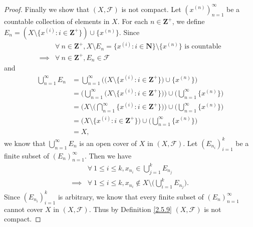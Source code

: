 \begin{proof}
    Finally we show that \((X, \mathcal{F})\) is not compact.
    Let \((x^{(n)})_{n = 1}^\infty\) be a countable collection of elements in \(X\).
    For each \(n \in \mathbf{Z}^+\), we define \(E_n = (X \setminus \{x^{(i)} : i \in \mathbf{Z}^+\}) \cup \{x^{(n)}\}\).
    Since
    \begin{align*}
                 & \forall\ n \in \mathbf{Z}^+, X \setminus E_n = \{x^{(i)} : i \in \mathbf{N}\} \setminus \{x^{(n)}\} \text{ is countable} \\
        \implies & \forall\ n \in \mathbf{Z}^+, E_n \in \mathcal{F}
    \end{align*}
    and
    \begin{align*}
        \bigcup_{n = 1}^\infty E_n & = \bigcup_{n = 1}^\infty \Big(\big(X \setminus \{x^{(i)} : i \in \mathbf{Z}^+\}\big) \cup \{x^{(n)}\}\Big)                                        \\
                                   & = \bigg(\bigcup_{n = 1}^\infty \big(X \setminus \{x^{(i)} : i \in \mathbf{Z}^+\}\big)\bigg) \cup \bigg(\bigcup_{n = 1}^\infty \{x^{(n)}\}\bigg)   \\
                                   & = \Bigg(X \setminus \bigg(\bigcap_{n = 1}^\infty \{x^{(i)} : i \in \mathbf{Z}^+\}\bigg)\Bigg) \cup \bigg(\bigcup_{n = 1}^\infty \{x^{(n)}\}\bigg) \\
                                   & = \big(X \setminus \{x^{(i)} : i \in \mathbf{Z}^+\}\big) \cup \bigg(\bigcup_{n = 1}^\infty \{x^{(n)}\}\bigg)                                      \\
                                   & = X,
    \end{align*}
    we know that \(\bigcup_{n = 1}^\infty E_n\) is an open cover of \(X\) in \((X, \mathcal{F})\).
    Let \((E_{n_i})_{i = 1}^k\) be a finite subset of \((E_n)_{n = 1}^\infty\).
    Then we have
    \begin{align*}
                 & \forall\ 1 \leq i \leq k, x_{n_i} \in \bigcup_{j = 1}^k E_{n_j}                             \\
        \implies & \forall\ 1 \leq i \leq k, x_{n_i} \notin X \setminus \bigg(\bigcup_{i = 1}^k E_{n_j}\bigg).
    \end{align*}
    Since \((E_{n_i})_{i = 1}^k\) is arbitrary, we know that every finite subset of \((E_n)_{n = 1}^\infty\) cannot cover \(X\) in \((X, \mathcal{F})\).
    Thus by Definition \ref{2.5.9} \((X, \mathcal{F})\) is not compact.
\end{proof}

